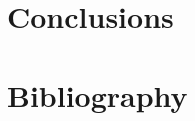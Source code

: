 \documentclass[11pt]{report}
\begin{document}
\chapter{Conclusions}
  \label{ch:conclusions}

\graphicspath{}


%
%
%
%
%
%
\clearpage
\chapter*{Bibliography}

\begin{singlespace}

  \setlength{}

  \raggedright
  \printbibliography[
    heading = none
  ]
\end{singlespace}
\end{document}

